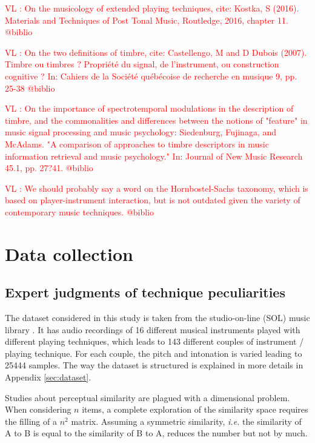 \documentclass{article}
\newcommand{\vl}[1]{\textcolor{red}{VL : #1}}
\begin{document}
\vl{On the musicology of extended playing techniques, cite:
Kostka, S (2016). Materials and Techniques of Post Tonal Music, Routledge, 2016, chapter 11. @biblio}

\vl{On the two definitions of timbre, cite:
Castellengo, M and D Dubois (2007). Timbre ou timbres ? Propri\'{e}t\'{e}
du signal, de l'instrument, ou construction cognitive ? In: Cahiers
de la Soci\'{e}t\'{e} qu\'{e}b\'{e}coise de recherche en musique 9, pp. 25-38
 @biblio}
 
\vl{On the importance of spectrotemporal modulations in the description
of timbre, and the commonalities and differences between the notions of
"feature" in music signal processing and music psychology:
Siedenburg, Fujinaga, and McAdams. "A comparison of
approaches to timbre descriptors in music information retrieval
and music psychology." In: Journal of New Music Research 45.1,
pp. 27?41. @biblio}

\vl{We should probably say a word on the Hornbostel-Sachs taxonomy,
which is based on player-instrument interaction, but is not outdated
given the variety of contemporary music techniques. @biblio}



\section{Data collection}\label{sec:xp1}


\subsection{Expert judgments of technique peculiarities}

The dataset considered in this study is taken
from the studio-on-line (SOL) music library  \cite{peeters2000instrument}.
It has audio recordings of 16 different musical instruments played
with different playing techniques,
which leads to 143 different couples of instrument / playing technique.
For each couple, the pitch and intonation is varied leading to 25444 samples. 
The way the dataset is structured
is explained in more details in Appendix \ref{sec:dataset}.

Studies about perceptual similarity are plagued with a dimensional problem.
When considering $n$ items, a complete exploration of the similarity space
requires the filling of a $n^2$ matrix. Assuming a symmetric similarity,
\textit{i.e.} the similarity of A to B is equal to the similarity of B to A,
reduces the number but not by much.
\end{document}
